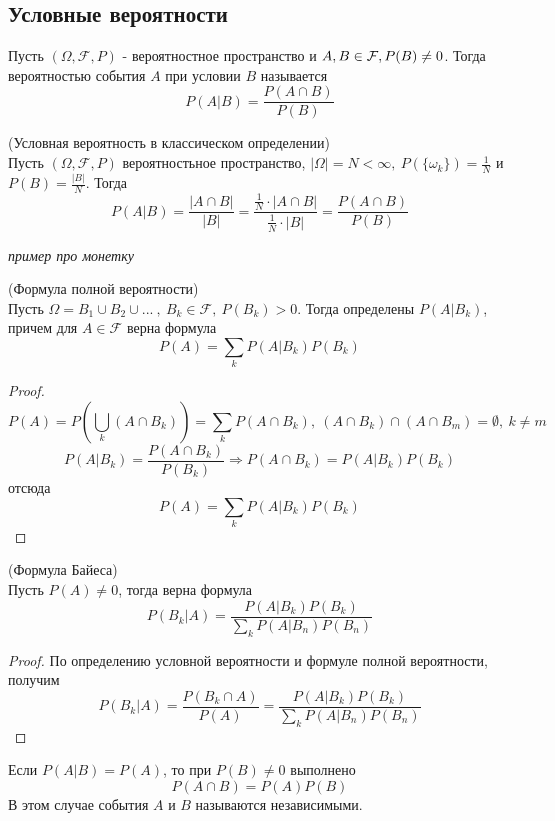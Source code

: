 \documentclass[a4paper, 12pt]{article}
\begin{document}
\subsection{Условные вероятности}
\begin{definition}
    Пусть $(\Omega, \mathcal{F}, P)$ - вероятностное пространство и $A,B\in \mathcal{F},\\
    P(B)\ne 0$. Тогда вероятностью события $A$ при условии $B$ называется
    \[P(A|B)=\frac{P(A\cap B)}{P(B)}\]
\end{definition}
\begin{definition} (Условная вероятность в классическом определении)\\
    Пусть $(\Omega, \mathcal{F}, P)$ вероятностьное пространство, $|\Omega|=N<\infty,\ P(\{\omega_k\})=\frac{1}{N}$ и $P(B)=\frac{|B|}{N}$. Тогда
    \[P(A|B)=\frac{|A\cap B|}{|B|}=\frac{\frac{1}{N}\cdot |A\cap B|}{\frac{1}{N}\cdot |B|}=\frac{P(A\cap B)}{P(B)}\]
\end{definition}
\begin{example}
    \textit{пример про монетку}
\end{example}
\begin{theorem} (Формула полной вероятности)\\
    Пусть $\Omega=B_1\cup B_2\cup...\ ,\ B_k\in \mathcal{F},\ P(B_k)>0$. Тогда определены $P(A|B_k)$, причем для $A\in \mathcal{F}$ верна формула
    \[P(A)=\sum\limits_{k}P(A|B_k)P(B_k)\]
\end{theorem}
\begin{proof}
    \[P(A)=P\left(\bigcup\limits_k (A\cap B_k)\right)=\sum\limits_{k}P(A\cap B_k),\ (A\cap B_k)\cap (A\cap B_m) = \emptyset,\ k\ne m\]
    \[P(A|B_k)=\frac{P(A\cap B_k)}{P(B_k)} \Rightarrow P(A\cap B_k)=P(A|B_k)P(B_k)\]
    отсюда
    \[P(A)=\sum\limits_{k}P(A|B_k)P(B_k)\]
\end{proof}
\begin{theorem} (Формула Байеса)\\
    Пусть $P(A)\ne 0$, тогда верна формула
    \[P(B_k|A)=\frac{P(A|B_k)P(B_k)}{\sum\limits_{k}P(A|B_n)P(B_n)}\]
\end{theorem}
\begin{proof}
    По определению условной вероятности и формуле полной вероятности, получим
    \[P(B_k|A)=\frac{P(B_k\cap A)}{P(A)}=\frac{P(A|B_k)P(B_k)}{\sum\limits_{k}P(A|B_n)P(B_n)}\]
\end{proof}
\begin{definition}
    Если $P(A|B)=P(A)$, то при $P(B)\ne 0$ выполнено
    \[P(A\cap B)=P(A)P(B)\]
    В этом случае события $A$ и $B$ называются независимыми.
\end{definition}
\end{document}
